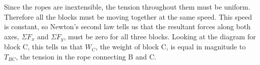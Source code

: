 \documentclass[../classical_mechanics.tex]{subfiles}
\begin{document}
\begin{example}
\begin{figure}[H]
                \end{figure}
                Since the ropes are inextensible, the tension throughout them must be uniform.
                Therefore all the blocks must be moving together at the same speed.
                This speed is constant, so Newton's second law tells us that the resultant forces along both axes, $\Sigma F_x$ and $\Sigma F_y$, must be zero for all three blocks.
                Looking at the diagram for block C, this tells us that $W_C$, the weight of block C, is equal in magnitude to $T_{BC}$, the tension in the rope connecting B and C.


\end{example}
\end{document}
